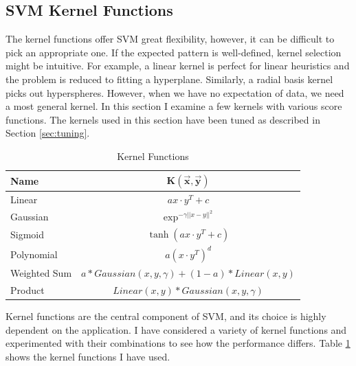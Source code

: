 \documentclass[12pt,a4paper,notitlepage,twoside]{scrbook}
\begin{document}
\subsection{SVM Kernel Functions}
\label{sec:kernels}
The kernel functions offer SVM great flexibility, however, it can be difficult to pick an
appropriate one. If the expected pattern is well-defined, kernel selection might be
intuitive. For example, a linear kernel is perfect for linear heuristics and the problem
is reduced to fitting a hyperplane.  Similarly, a radial basis kernel picks out
hyperspheres. However, when we have no expectation of data, we need a most
general kernel.
In this section I examine a few kernels with various score functions. 
The kernels used in this section have been tuned as described in Section \ref{sec:tuning}.
\begin{table}[h]
\begin{center}
\begin{tabular}{|l|c|}
  \hline
  \textbf{Name} &\( \bm{K(\vec{x},\vec{y})}\)\\
  \hline\hline
  Linear  & \(ax\cdot y^T + c\)\\  
\hline
Gaussian  & \(\exp^{-\gamma ||x-y||^2}\)\\
\hline
Sigmoid   &   \(\tanh(ax \cdot y^T + c)\)\\
\hline
Polynomial& \(a(x\cdot y^T)^d\)  \\
\hline
Weighted Sum&  \(a*Gaussian(x,y,\gamma)+(1-a)*Linear(x,y)\)\\
\hline
Product     & \(Linear(x,y)*Gaussian(x,y,\gamma)\)\\
\hline
\end{tabular}
\end{center}
\caption{Kernel Functions \label{kfun}}
\end{table}

Kernel functions are the central component of SVM, and its
choice is highly dependent on the application. I have considered a variety of
kernel functions and experimented with their combinations to see how the
performance differs. Table \ref{kfun} shows the kernel functions I have used.
\end{document}
